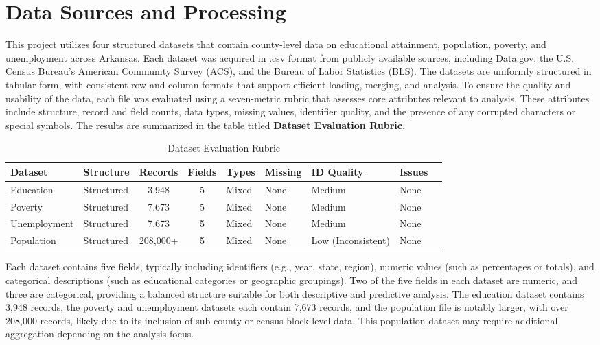 \documentclass[12pt]{llncs}
\begin{document}
\section{Data Sources and Processing}
This project utilizes four structured datasets that contain county-level data on educational attainment, population, poverty, and unemployment across Arkansas. Each dataset was acquired in .csv format from publicly available sources, including Data.gov, the U.S. Census Bureau’s American Community Survey (ACS), and the Bureau of Labor Statistics (BLS). The datasets are uniformly structured in tabular form, with consistent row and column formats that support efficient loading, merging, and analysis.
To ensure the quality and usability of the data, each file was evaluated using a seven-metric rubric that assesses core attributes relevant to analysis. These attributes include structure, record and field counts, data types, missing values, identifier quality, and the presence of any corrupted characters or special symbols. The results are summarized in the table titled \textbf{Dataset Evaluation Rubric.}
\begin{table}[h!]
\centering
\caption{Dataset Evaluation Rubric}
\label{tab:rubric}
\begin{tabular}{|l|l|c|c|l|l|l|l|l|}
\hline
\textbf{Dataset} & \textbf{Structure} & \textbf{Records} & \textbf{Fields} & \textbf{Types} & \textbf{Missing} & \textbf{ID Quality} & \textbf{Issues} \\ \midrule
Education & Structured & 3,948 & 5 & Mixed & None & Medium & None\\
Poverty & Structured & 7,673 & 5 & Mixed & None& Medium & None \\
Unemployment & Structured & 7,673 & 5 & Mixed & None & Medium & None\\
Population & Structured & 208,000+ & 5 & Mixed & None & Low (Inconsistent)  & None \\
\hline
\end{tabular}
\end{table}
Each dataset contains five fields, typically including identifiers (e.g., year, state, region), numeric values (such as percentages or totals), and categorical descriptions (such as educational categories or geographic groupings). Two of the five fields in each dataset are numeric, and three are categorical, providing a balanced structure suitable for both descriptive and predictive analysis. The education dataset contains 3,948 records, the poverty and unemployment datasets each contain 7,673 records, and the population file is notably larger, with over 208,000 records, likely due to its inclusion of sub-county or census block-level data. This population dataset may require additional aggregation depending on the analysis focus.
\end{document}

